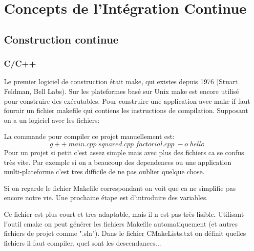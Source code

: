 \section{Concepts de l'Intégration Continue}

\subsection{Construction continue}
\subsubsection{C/C++}
Le premier logiciel de construction était make, qui existes depuis 1976 (Stuart Feldman, Bell Labs). Sur les plateformes basé sur Unix make est encore utilisé pour construire des exécutables.
Pour construire une application avec make if faut fournir un fichier makefile qui contiens les instructions de compilation. Supposant on a un logiciel avec les fichiers: 






La commande pour compiler ce projet manuellement est:
$$g++\;main.cpp\;squared.cpp\;factorial.cpp\;-o\;hello$$
Pour un projet si petit c'est assez simple mais avec plus des fichiers ca se confus très vite.
Par exemple si on a beaucoup des dependences ou une application multi-plateforme c'est tres difficile de ne pas oublier quelque chose.
\newpage

Si on regarde le fichier Makefile correspondant on voit que ca ne simplifie pas encore notre vie. Une prochaine étape est d'introduire des variables.


Ce fichier est plus court et tres adaptable, mais il n est pas très lisible.
Utilisant l'outil cmake on peut générer les fichiers Makefile automatiquement (et autres fichiers de projet comme ".sln").
Dans le fichier CMakeLists.txt on définit quelles fichiers il faut compiler, quel sont les descendances...




